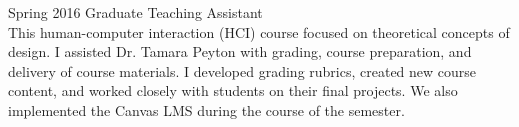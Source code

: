 \documentclass[]{cv-style}          %
\begin{document}
\begin{entrylist}
{  }
\entry
  {Spring 2016}
  {Graduate Teaching Assistant}
  {}
  {\\ 
  This human-computer interaction (HCI) course focused on theoretical concepts of design. I assisted Dr. Tamara Peyton with grading, course preparation, and delivery of course materials. I developed grading rubrics, created new course content, and worked closely with students on their final projects. We also implemented the Canvas LMS during the course of the semester.  
  }
\end{entrylist}  
\end{document}

